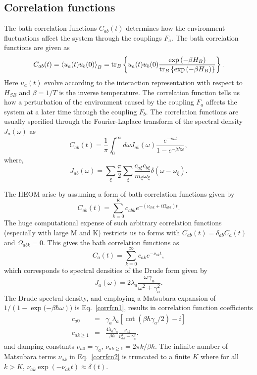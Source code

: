 \documentclass[11pt]{article}
\newcommand{\tr}{{\rm tr} }
\begin{document}
\subsection{Correlation functions}
The bath correlation functions $C_{ab}(t)$ determines how the environment fluctuations affect the system through the couplings $F_a$. The bath correlation functions are given as
\begin{equation}
C_{ab}(t) = \left< u_a(t)u_b(0)\right>_B = \tr_B\left\{u_a(t)u_b(0)\frac{ \exp \left(-\beta H_B\right)}{\tr_B\left\{\exp\left(-\beta H_B\right)\right\}}  \right\}.
\end{equation}
Here $u_a(t)$ evolve according to the interaction representation with respect to $H_{SB}$ and $\beta = 1/T$ is the inverse temperature. The correlation function tells us how a perturbation of the environment caused by the coupling $F_a$ affects the system at a later time through the coupling $F_b$. The correlation functions are usually specified through the Fourier-Laplace transform of the spectral density $J_a(\omega)$ as
\begin{equation}
C_{ab}(t) =  \frac{1}{\pi} \int_0^{\infty} d\omega J_{ab}\left(\omega\right) \frac{e^{-i \omega t}}{1-e^{-\beta\hbar\omega}},
\label{corrfcn1}
\end{equation}
where, 
\begin{equation}
J_{ab}(\omega) = \sum_\xi \frac{\pi}{2} \sum_{\xi} \frac{c_{a\xi} c_{b\xi}}{m_\xi \omega_\xi} \delta(\omega-\omega_\xi).
\end{equation}

The HEOM arise by assuming a form of bath correlation functions given by
\begin{equation}
C_{ab}(t) = \sum_{k=0}^K c_{abk} e^{- \left(\nu_{abk}+i\Omega_{abk}\right) t}.
\end{equation}
The huge computational expense of such arbitrary correlation functions (especially with large M and K) restricts us to forms with $C_{ab}(t) = \delta_{ab} C_a(t)$ and $\Omega_{abk}=0$. This gives the bath correlation functions as
\begin{equation}
C_a(t) = \sum_{k=0}^\infty c_{ak} e^{- \nu_{ak}t },
\label{corrfcn2}
\end{equation}
which corresponds to spectral densities of the Drude form given by
\begin{equation}
J_a(\omega) = 2 \lambda_a\frac{ \omega\gamma_a } {\omega^2 + \gamma_a^2}.
\end{equation}
The Drude spectral density, and employing a Matsubara expansion of $1/({1-\exp({-\beta\hbar\omega}}))$ is Eq.~\ref{corrfcn1}, results in correlation function coefficients
\begin{eqnarray}
c_{a0} &=& {\gamma_a \lambda_a}\left[ \cot (\beta \hbar \gamma_a/2) - i\right] \\
c_{ak\ge1} &=& \frac{4 \lambda_a \gamma_a}{\beta \hbar} \frac{\nu_{ak}}{\nu_{ak}^2-\gamma_a^2}.
\label{coefficients}
\end{eqnarray}
and damping constants $\nu_{a0} = \gamma_a$, $\nu_{ak\ge1} = 2\pi k/\beta\hbar$. The infinite number of Matsubara terms $\nu_{ak}$ in Eq.~\ref{corrfcn2} is truncated to a finite $K$ where for all $k>K$, $\nu_{ak}\exp(-\nu_{ak}t)\approx \delta(t)$.
\end{document}
